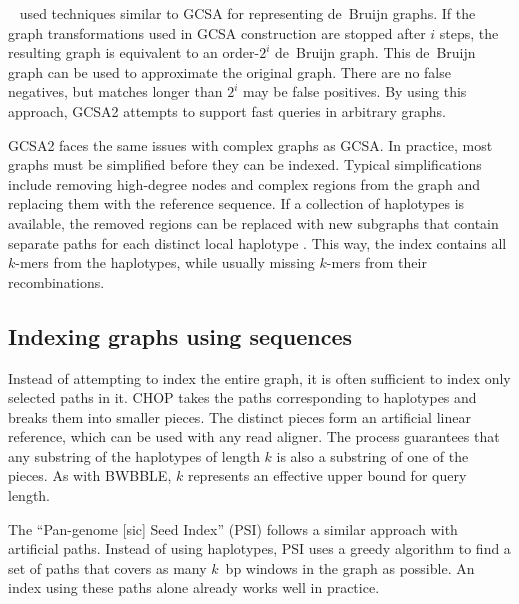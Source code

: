 \citeauthor{Bowe_2012}\ \cite{Bowe_2012} used techniques similar to GCSA for representing de~Bruijn graphs.
If the graph transformations used in GCSA construction are stopped after $i$ steps, the resulting graph is equivalent to an order-$2^{i}$ de~Bruijn graph.
This de~Bruijn graph can be used to approximate the original graph.
There are no false negatives, but matches longer than $2^{i}$ may be false positives.
By using this approach, GCSA2 \cite{Siren_2017} attempts to support fast queries in arbitrary graphs.

GCSA2 faces the same issues with complex graphs as GCSA.
In practice, most graphs must be simplified before they can be indexed.
Typical simplifications include removing high-degree nodes and complex regions from the graph and replacing them with the reference sequence.
If a collection of haplotypes is available, the removed regions can be replaced with new subgraphs that contain separate paths for each distinct local haplotype \cite{Siren_2019}.
This way, the index contains all $k$-mers from the haplotypes, while usually missing $k$-mers from their recombinations.

\subsection{Indexing graphs using sequences}

Instead of attempting to index the entire graph, it is often sufficient to index only selected paths in it.
CHOP \cite{Mokveld_2018} takes the paths corresponding to haplotypes and breaks them into smaller pieces.
The distinct pieces form an artificial linear reference, which can be used with any read aligner.
The process guarantees that any substring of the haplotypes of length $k$ is also a substring of one of the pieces.
As with BWBBLE, $k$ represents an effective upper bound for query length.

The ``Pan-genome [sic] Seed Index'' (PSI) \cite{Ghaffaari_2019} follows a similar approach with artificial paths.
Instead of using haplotypes, PSI uses a greedy algorithm to find a set of paths that covers as many $k$~bp windows in the graph as possible.
An index using these paths alone already works well in practice.


